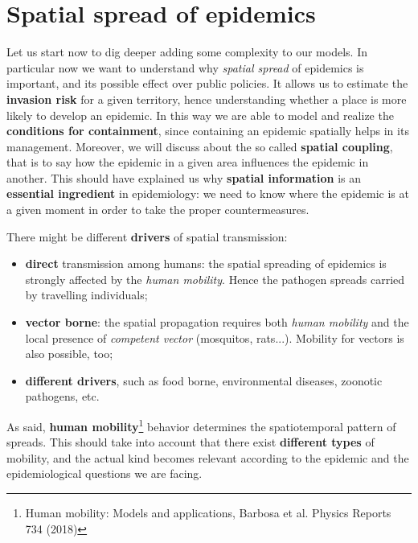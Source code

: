 \documentclass[../main/main.tex]{subfiles}
\begin{document}
\chapter{Spatial spread of epidemics}

Let us start now to dig deeper adding some complexity to our models. In particular now we want to understand why \textit{spatial spread} of epidemics is important, and its possible effect over public policies. It allows us to estimate the \textbf{invasion risk} for a given territory, hence understanding whether a place is more likely to develop an epidemic. In this way we are able to model and realize the \textbf{conditions for containment}, since containing an epidemic spatially helps in its management. Moreover, we will discuss about the so called \textbf{spatial coupling}, that is to say how the epidemic in a given area influences the epidemic in another. This should have explained us why \textbf{spatial information} is an \textbf{essential ingredient} in epidemiology: we need to know where the epidemic is at a given moment in order to take the proper countermeasures.

There might be different \textbf{drivers} of spatial transmission:
\begin{itemize}
    \item \textbf{direct} transmission among humans: the spatial spreading of epidemics is strongly affected by the \textit{human mobility}. Hence the pathogen spreads carried by travelling individuals;
    \item \textbf{vector borne}: the spatial propagation requires both \textit{human mobility} and the local presence of \textit{competent vector} (mosquitos, rats...). Mobility for vectors is also possible, too;
    \item \textbf{different drivers}, such as food borne, environmental diseases, zoonotic pathogens, etc.
\end{itemize}

As said, \textbf{human mobility}\footnote{Human mobility: Models and applications, Barbosa et al. Physics Reports 734 (2018)} behavior determines the spatiotemporal pattern of spreads. This should take into account that there exist \textbf{different types} of mobility, and the actual kind becomes relevant according to the epidemic and the epidemiological questions we are facing.
\end{document}
